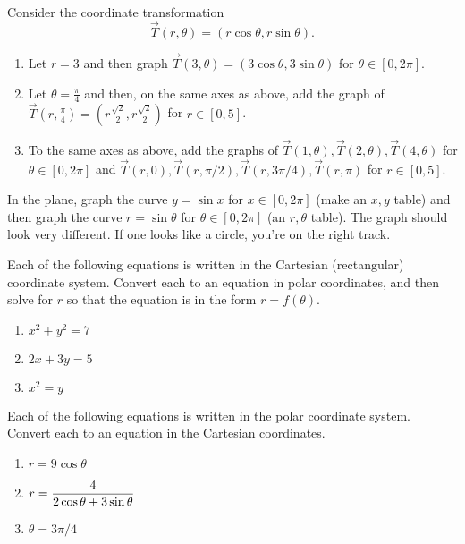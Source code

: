 \begin{problem} \label{polar coordinate transformation graph}
Consider the coordinate transformation $$\vec T(r,\theta) = (r\cos\theta,r\sin\theta).$$ 
\begin{enumerate}
\item Let $r=3$ and then graph $\vec T(3,\theta)=(3\cos\theta,3\sin\theta)$ for $\theta\in[0,2\pi]$.
\item Let $\theta=\frac{\pi}{4}$ and then, on the same axes as above, add the graph of 
$\vec T\left(r,\frac{\pi}{4}\right)=\left(r\frac{\sqrt 2}{2},r \frac{\sqrt 2}{2}\right)$ for $r\in[0,5]$.
\item To the same axes as above, add the graphs of 
$\vec T(1,\theta), \vec T(2,\theta), \vec T(4,\theta)$  for $\theta\in[0,2\pi]$ and 
$\vec T(r,0), \vec T(r,\pi/2), \vec T(r,3\pi/4), \vec T(r,\pi)$ for $r\in[0,5]$. 
\end{enumerate}
\end{problem}


\begin{problem} 
In the plane, graph the curve $y=\sin x$ for $x\in[0,2\pi]$ (make an $x,y$ table) and then graph the curve $r=\sin\theta$ for $\theta\in[0,2\pi]$ (an $r,\theta$ table).  The graph should look very different.  If one looks like a circle, you're on the right track.  
\end{problem}

\begin{problem}
Each of the following equations is written in the Cartesian (rectangular) coordinate system.  Convert each to an equation in polar coordinates, and then solve for $r$ so that the equation is in the form $r=f(\theta)$.
\begin{enumerate}
\item $x^2+y^2=7$
\item $2x+3y=5$
\item $x^2=y$
\end{enumerate}
\end{problem}

\begin{problem} 
Each of the following equations is written in the polar coordinate system.  Convert each to an equation in the Cartesian coordinates.
\begin{enumerate}
\item $r=9\cos\theta$
\item $\displaystyle r=\frac{4}{2\cos\theta+3\sin\theta}$
\item $\theta = 3\pi/4$
\end{enumerate}
\end{problem}

